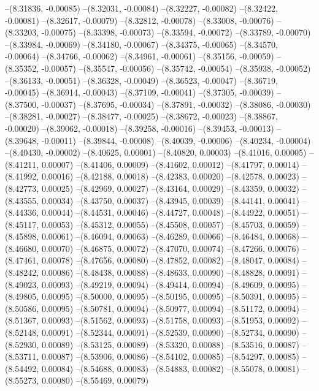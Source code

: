--(8.31836, -0.00085)
--(8.32031, -0.00084)
--(8.32227, -0.00082)
--(8.32422, -0.00081)
--(8.32617, -0.00079)
--(8.32812, -0.00078)
--(8.33008, -0.00076)
--(8.33203, -0.00075)
--(8.33398, -0.00073)
--(8.33594, -0.00072)
--(8.33789, -0.00070)
--(8.33984, -0.00069)
--(8.34180, -0.00067)
--(8.34375, -0.00065)
--(8.34570, -0.00064)
--(8.34766, -0.00062)
--(8.34961, -0.00061)
--(8.35156, -0.00059)
--(8.35352, -0.00057)
--(8.35547, -0.00056)
--(8.35742, -0.00054)
--(8.35938, -0.00052)
--(8.36133, -0.00051)
--(8.36328, -0.00049)
--(8.36523, -0.00047)
--(8.36719, -0.00045)
--(8.36914, -0.00043)
--(8.37109, -0.00041)
--(8.37305, -0.00039)
--(8.37500, -0.00037)
--(8.37695, -0.00034)
--(8.37891, -0.00032)
--(8.38086, -0.00030)
--(8.38281, -0.00027)
--(8.38477, -0.00025)
--(8.38672, -0.00023)
--(8.38867, -0.00020)
--(8.39062, -0.00018)
--(8.39258, -0.00016)
--(8.39453, -0.00013)
--(8.39648, -0.00011)
--(8.39844, -0.00008)
--(8.40039, -0.00006)
--(8.40234, -0.00004)
--(8.40430, -0.00002)
--(8.40625, 0.00001)
--(8.40820, 0.00003)
--(8.41016, 0.00005)
--(8.41211, 0.00007)
--(8.41406, 0.00009)
--(8.41602, 0.00012)
--(8.41797, 0.00014)
--(8.41992, 0.00016)
--(8.42188, 0.00018)
--(8.42383, 0.00020)
--(8.42578, 0.00023)
--(8.42773, 0.00025)
--(8.42969, 0.00027)
--(8.43164, 0.00029)
--(8.43359, 0.00032)
--(8.43555, 0.00034)
--(8.43750, 0.00037)
--(8.43945, 0.00039)
--(8.44141, 0.00041)
--(8.44336, 0.00044)
--(8.44531, 0.00046)
--(8.44727, 0.00048)
--(8.44922, 0.00051)
--(8.45117, 0.00053)
--(8.45312, 0.00055)
--(8.45508, 0.00057)
--(8.45703, 0.00059)
--(8.45898, 0.00061)
--(8.46094, 0.00063)
--(8.46289, 0.00066)
--(8.46484, 0.00068)
--(8.46680, 0.00070)
--(8.46875, 0.00072)
--(8.47070, 0.00074)
--(8.47266, 0.00076)
--(8.47461, 0.00078)
--(8.47656, 0.00080)
--(8.47852, 0.00082)
--(8.48047, 0.00084)
--(8.48242, 0.00086)
--(8.48438, 0.00088)
--(8.48633, 0.00090)
--(8.48828, 0.00091)
--(8.49023, 0.00093)
--(8.49219, 0.00094)
--(8.49414, 0.00094)
--(8.49609, 0.00095)
--(8.49805, 0.00095)
--(8.50000, 0.00095)
--(8.50195, 0.00095)
--(8.50391, 0.00095)
--(8.50586, 0.00095)
--(8.50781, 0.00094)
--(8.50977, 0.00094)
--(8.51172, 0.00094)
--(8.51367, 0.00093)
--(8.51562, 0.00093)
--(8.51758, 0.00093)
--(8.51953, 0.00092)
--(8.52148, 0.00091)
--(8.52344, 0.00091)
--(8.52539, 0.00090)
--(8.52734, 0.00090)
--(8.52930, 0.00089)
--(8.53125, 0.00089)
--(8.53320, 0.00088)
--(8.53516, 0.00087)
--(8.53711, 0.00087)
--(8.53906, 0.00086)
--(8.54102, 0.00085)
--(8.54297, 0.00085)
--(8.54492, 0.00084)
--(8.54688, 0.00083)
--(8.54883, 0.00082)
--(8.55078, 0.00081)
--(8.55273, 0.00080)
--(8.55469, 0.00079)
